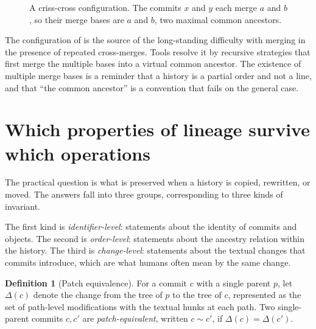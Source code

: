 \documentclass[11pt,twoside,openright]{book}
\theoremstyle{plain}
\theoremstyle{definition}
\newtheorem{definition}[theorem]{Definition}
\theoremstyle{remark}
\begin{document}
\begin{figure}[t]
\centering
{}
\caption{A criss-cross configuration. The commits $x$ and $y$ each merge $a$ and $b$, so their merge bases are $a$ and $b$, two maximal common ancestors.}
\label{fig:crisscross}
\end{figure}

The configuration of  is the source of the long-standing difficulty with merging in the presence of repeated cross-merges. Tools resolve it by recursive strategies that first merge the multiple bases into a virtual common ancestor. The existence of multiple merge bases is a reminder that a history is a partial order and not a line, and that ``the common ancestor'' is a convention that fails on the general case.

\section{Which properties of lineage survive which operations}

The practical question is what is preserved when a history is copied, rewritten, or moved. The answers fall into three groups, corresponding to three kinds of invariant.

The first kind is \emph{identifier-level}: statements about the identity of commits and objects. The second is \emph{order-level}: statements about the ancestry relation within the history. The third is \emph{change-level}: statements about the textual changes that commits introduce, which are what humans often mean by the same change.

\begin{definition}[Patch equivalence]\label{def:patcheq}
For a commit $c$ with a single parent $p$, let $\Delta(c)$ denote the change from the tree of $p$ to the tree of $c$, represented as the set of path-level modifications with the textual hunks at each path. Two single-parent commits $c,c'$ are \emph{patch-equivalent}, written $c\sim c'$, if $\Delta(c)=\Delta(c')$.
\end{definition}
\end{document}
